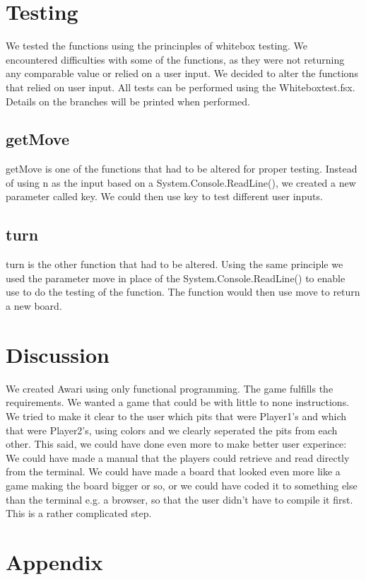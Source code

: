 \documentclass[a4paper]{report}
\begin{document}
\section*{Testing}
We tested the functions using the princinples of whitebox testing. We encountered difficulties with some of the functions, as they were not returning any comparable value or relied on a user input.
We decided to alter the functions that relied on user input. All tests can be performed using the Whiteboxtest.fsx. Details on the branches will be printed when performed.

\subsection*{getMove}
getMove is one of the functions that had to be altered for proper testing. Instead of using n as the input based on a System.Console.ReadLine(), we created a new parameter called key.
We could then use key to test different user inputs.


\subsection*{turn}
turn is the other function that had to be altered. Using the same principle we used the parameter move in place of the System.Console.ReadLine() to enable use to do the testing of the function. The function would then use move
to return a new board.


\section*{Discussion}
We created Awari using only functional programming. The game fulfills the requirements. We wanted a game that could be with little to none instructions. We tried to make it clear to the user which pits that were Player1's and which that were Player2's, using colors and we clearly seperated the pits from each other. This said, we could have done even more to make better user experince: We could have made a manual that the players could retrieve and read directly from the terminal. We could have made a board that looked even more like a game making the board bigger or so, or we could have coded it to something else than the terminal e.g. a browser, so that the user didn't have to compile it first. This is a rather complicated step. 

\newpage
\section*{Appendix}
\lstset{language=FSharp}

\end{document}
